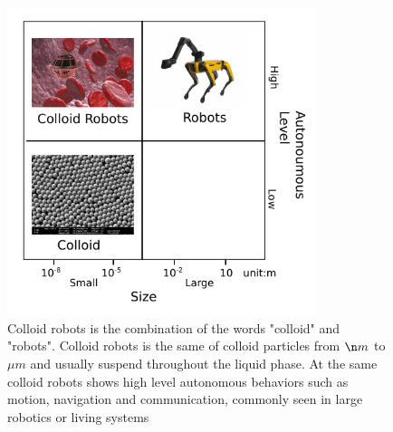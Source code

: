 \begin{figure}
\centering
\includegraphics[width=9cm]{figures/1_1.pdf}
\caption{Colloid robots is the combination of the words "colloid" and "robots". Colloid robots is the same of colloid particles from $\n m$ to$\mu m$ and usually suspend throughout the liquid phase. At the same colloid robots shows high level autonomous behaviors such as motion, navigation and communication, commonly seen in large robotics or living systems}
\label{fig:1.1}
\end{figure}


